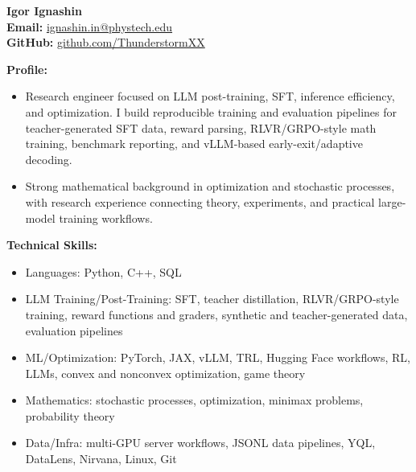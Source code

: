 \documentclass[a4paper, fontsize=11pt]{article}
\begin{document}
\normalsize

\noindent
{\LARGE \textbf{Igor Ignashin}}\\[0.5em]

\noindent
\textbf{Email:} \href{mailto:ignashin.in@phystech.edu}{ignashin.in@phystech.edu} \\
\textbf{GitHub:} \href{https://github.com/ThunderstormXX}{github.com/ThunderstormXX}

\vspace{0.5cm}

\textbf{Profile:}
\begin{itemize}
    \item Research engineer focused on LLM post-training, SFT, inference efficiency, and optimization. I build reproducible training and evaluation pipelines for teacher-generated SFT data, reward parsing, RLVR/GRPO-style math training, benchmark reporting, and vLLM-based early-exit/adaptive decoding.
    \item Strong mathematical background in optimization and stochastic processes, with research experience connecting theory, experiments, and practical large-model training workflows.
\end{itemize}

\textbf{Technical Skills:}
\begin{itemize}
    \item Languages: Python, C++, SQL
    \item LLM Training/Post-Training: SFT, teacher distillation, RLVR/GRPO-style training, reward functions and graders, synthetic and teacher-generated data, evaluation pipelines
    \item ML/Optimization: PyTorch, JAX, vLLM, TRL, Hugging Face workflows, RL, LLMs, convex and nonconvex optimization, game theory
    \item Mathematics: stochastic processes, optimization, minimax problems, probability theory
    \item Data/Infra: multi-GPU server workflows, JSONL data pipelines, YQL, DataLens, Nirvana, Linux, Git
\end{itemize}
\end{document}
